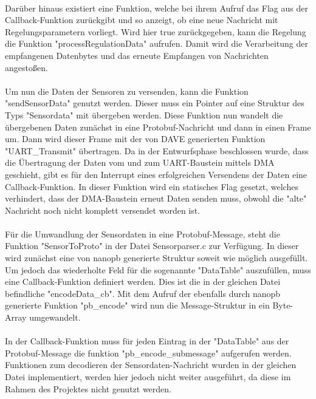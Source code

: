 \paragraph{}
Darüber hinaus existiert eine Funktion, welche bei ihrem Aufruf das Flag aus der Callback-Funktion zurückgibt und so anzeigt, ob eine neue Nachricht mit Regelungsparametern vorliegt. Wird hier true zurückgegeben, kann die Regelung die Funktion "processRegulationData" aufrufen. Damit wird die Verarbeitung der empfangenen Datenbytes und das erneute Empfangen von Nachrichten angestoßen.
\paragraph{}
Um nun die Daten der Sensoren zu versenden, kann die Funktion "sendSensorData" genutzt werden. Dieser muss ein Pointer auf eine Struktur des Typs "Sensordata" mit übergeben werden. Diese Funktion nun wandelt die übergebenen Daten zunächst in eine Protobuf-Nachricht und dann in einen Frame um. Dann wird dieser Frame mit der von DAVE generierten Funktion "UART\_Transmit" übertragen. Da in der Entwurfsphase beschlossen wurde, dass die Übertragung der Daten vom und zum UART-Baustein mittels DMA geschieht, gibt es für den Interrupt eines erfolgreichen Versendens der Daten eine Callback-Funktion. In dieser Funktion wird ein statisches Flag gesetzt, welches verhindert, dass der DMA-Baustein erneut Daten senden muss, obwohl die "alte" Nachricht noch nicht komplett versendet worden ist.
\paragraph{}
Für die Umwandlung der Sensordaten in eine Protobuf-Message, steht die Funktion "SensorToProto" in der Datei Sensorparser.c zur Verfügung. In dieser wird zunächst eine von nanopb generierte Struktur soweit wie möglich ausgefüllt. Um jedoch das wiederholte Feld für die sogenannte "DataTable" auszufüllen, muss eine Callback-Funktion definiert werden. Dies ist die in der gleichen Datei befindliche "encodeData\_cb". Mit dem Aufruf der ebenfalls durch nanopb generierte Funktion "pb\_encode" wird nun die Message-Struktur in ein Byte-Array umgewandelt.
\paragraph{}
In der Callback-Funktion muss für jeden Eintrag in der "DataTable" aus der Protobuf-Message die funktion "pb\_encode\_submessage" aufgerufen werden. Funktionen zum decodieren der Sensordaten-Nachricht wurden in der gleichen Datei implementiert, werden hier jedoch nicht weiter ausgeführt, da diese im Rahmen des Projektes nicht genutzt werden.
